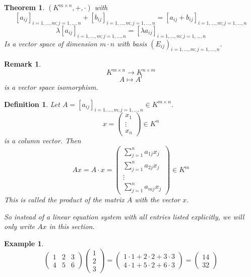 \documentclass[a4paper,landscape,twocolumn]{article}
\newtheorem{theorem}{Theorem}
\newtheorem{defi}{Definition}
\newtheorem{ex}{Example}
\newtheorem{rem}{Remark}
\begin{document}
\begin{theorem}
  \label{satz-6-2}
  $(K^{m\times n}, +, \cdot)$ with
  \[
    [a_{ij}]_{i=1,\dots,m; j=1,\dots,n} + [b_{ij}]_{i=1,\dots,m; j=1,\dots,n}
    = [a_{ij} + b_{ij}]_{i=1,\dots,m; j=1,\dots,n}
  \] \[
    \lambda [a_{ij}]_{i=1,\dots,m; j=1,\dots,n}
    = [\lambda a_{ij}]_{i=1,\dots,m; j=1,\dots,n}
  \]
  Is a vector space of dimension $m \cdot n$ with basis $(E_{ij})_{i=1,\dots,m;j=1,\dots,n}$.
\end{theorem}
%
\begin{rem}
  \label{bemerkung-6-3}
  \[ K^{m\times n} \rightarrow K^{n\times m} \]
  \[ A \mapsto A^t \]
  is a vector space isomorphism.
\end{rem}
%
\begin{defi}
  Let $A = [a_{ij}]_{i=1,\dots,m;j=1,\dots,n} \in K^{m\times n}$.
  \[ x = \begin{pmatrix} x_1 \\ \vdots \\ x_n \end{pmatrix} \in K^n \]
  is a column vector. Then
  \[
    Ax = A \cdot x = \begin{pmatrix}
      \sum_{j=1}^n a_{1j} x_j \\
      \sum_{j=1}^n a_{2j} x_j \\
      \vdots \\
      \sum_{j=1}^n a_{mj} x_j
    \end{pmatrix}
    \in K^m
  \]
  This is called the product of the matrix $A$ with the vector $x$.

  So instead of a linear equation system with all entries listed explicitly,
  we will only write $Ax$ in this section.
\end{defi}
%
\begin{ex}
  \[
    \begin{pmatrix}
      1 & 2 & 3 \\
      4 & 5 & 6
    \end{pmatrix}
    \begin{pmatrix}
      1 \\ 2 \\ 3
    \end{pmatrix}
    = \begin{pmatrix}
      1 \cdot 1 + 2 \cdot 2 + 3 \cdot 3 \\
      4 \cdot 1 + 5 \cdot 2 + 6 \cdot 3
    \end{pmatrix}
    = \begin{pmatrix}
      14 \\ 32
    \end{pmatrix}
  \]
\end{ex}
\end{document}
